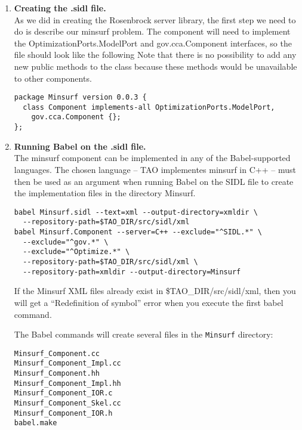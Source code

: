 \documentclass[doublespacing,12pt]{article}
\begin{document}
\begin{enumerate}
\item \textbf{Creating the .sidl file.}  \\
As we did in creating the Rosenbrock server library, the first step we
need to do is describe our minsurf problem.  The component will need
to implement the \textsf{OptimizationPorts.ModelPort} and 
\textsf{gov.cca.Component}
interfaces, so the file should look like the following 
Note that
there is no possibility to add any new public methods to the class
because these methods would be unavailable to other components.
\begin{verbatim}
package Minsurf version 0.0.3 {
  class Component implements-all OptimizationPorts.ModelPort,
    gov.cca.Component {};
};
\end{verbatim}

\item \textbf{Running Babel on the .sidl file.} \\
The minsurf component can be implemented in any of the Babel-supported
languages.  The chosen language -- TAO implementes minsurf in C++ --
must then be used as an argument when running Babel on the SIDL file
to create the implementation files in the directory Minsurf.
\begin{verbatim}
babel Minsurf.sidl --text=xml --output-directory=xmldir \
  --repository-path=$TAO_DIR/src/sidl/xml
babel Minsurf.Component --server=C++ --exclude="^SIDL.*" \
  --exclude="^gov.*" \
  --exclude="^Optimize.*" \
  --repository-path=$TAO_DIR/src/sidl/xml \
  --repository-path=xmldir --output-directory=Minsurf 
\end{verbatim}

If the Minsurf XML files already exist in \$TAO\_DIR/src/sidl/xml, 
then you will get a ``Redefinition of symbol'' error when you
execute the first babel command.

The Babel commands will create several files in the \texttt{Minsurf}
directory:
\begin{verbatim}
Minsurf_Component.cc
Minsurf_Component_Impl.cc
Minsurf_Component.hh
Minsurf_Component_Impl.hh
Minsurf_Component_IOR.c
Minsurf_Component_Skel.cc
Minsurf_Component_IOR.h
babel.make
\end{verbatim}


\end{enumerate}
\end{document}
